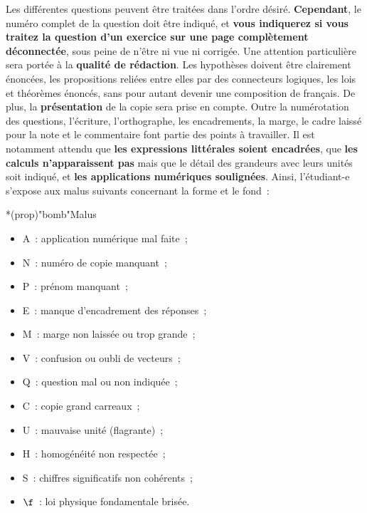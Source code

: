 \documentclass[a4paper, 10pt, garamond, oneside]{book}
\begin{document}
{Les différentes questions peuvent être traitées dans l'ordre désiré.
\textbf{Cependant}, le numéro complet de la question doit être indiqué, et
\textbf{vous indiquerez si vous traitez la question d'un exercice sur une page
	complètement déconnectée}, sous peine de n'être ni vue ni corrigée.
\bigbreak
Une attention particulière sera portée à la \textbf{qualité de rédaction}. Les
hypothèses doivent être clairement énoncées, les propositions reliées entre
elles par des connecteurs logiques, les lois et théorèmes énoncés, sans pour
autant devenir une composition de français.
\bigbreak
De plus, la \textbf{présentation} de la copie sera prise en compte. Outre la
numérotation des questions, l'écriture, l'orthographe, les encadrements, la
marge, le cadre laissé pour la note et le commentaire font partie des points à
travailler. Il est notamment attendu que \textbf{les expressions littérales
	soient encadrées}, que \textbf{les calculs n'apparaissent pas} mais que le
détail des grandeurs avec leurs unités soit indiqué, et \textbf{les applications
	numériques soulignées}.
\bigbreak
Ainsi, l'étudiant-e s'expose aux malus suivants concernant la forme et le fond~:
\begin{tcb}*(prop)"bomb"{Malus}
	\begin{minipage}[t]{0.50\linewidth}
		\begin{itemize}
			\item A~: application numérique mal faite~;
			\item N~: numéro de copie manquant~;
			\item P~: prénom manquant~;
			\item E~: manque d'encadrement des réponses~;
			\item M~: marge non laissée ou trop grande~;
			\item V~: confusion ou oubli de vecteurs~;
		\end{itemize}
	\end{minipage}
	\begin{minipage}[t]{0.50\linewidth}
		\begin{itemize}
			\item Q~: question mal ou non indiquée~;
			\item C~: copie grand carreaux~;
			\item U~: mauvaise unité (flagrante)~;
			\item H~: homogénéité non respectée~;
			\item S~: chiffres significatifs non cohérents~;
			\item $\f$~: loi physique fondamentale brisée.
		\end{itemize}
	\end{minipage}
\end{tcb}

}
\end{document}
